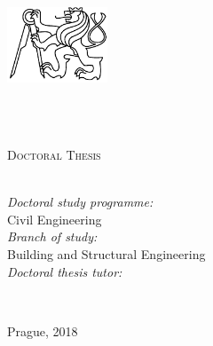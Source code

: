 \documentclass[
11pt, %
english, %
singlespacing, %
headsepline, %
]{MastersDoctoralThesis} %
\begin{document}
\begin{titlepage}
\begin{center}

\includegraphics[width=30mm]{figures/logo-cvut} \\
{\scshape\LARGE \univname\par} %
\HRule \\[0.2cm] %
\facname\\[0.2cm] %
\deptname %
\vspace{3.5cm}

{\huge \bfseries \ttitle\par}\vspace{1.0cm} %

\textsc{\Large Doctoral Thesis}\\[1.5cm] %
 
{\large \authorname}\\[3.0cm] %


\begin{minipage}[t]{\textwidth}
\begin{flushleft}
\emph{Doctoral study programme:} \\
Civil Engineering \\[0.5cm] %
\emph{Branch of study:} \\
Building and Structural Engineering \\[0.5cm] %

\emph{Doctoral thesis tutor:} \\
\supname %
\end{flushleft}
\end{minipage}\\[3cm]

\vfill

{\large Prague, 2018}\\[2cm] %
 
\vfill
\end{center}
\end{titlepage}

\end{document}
